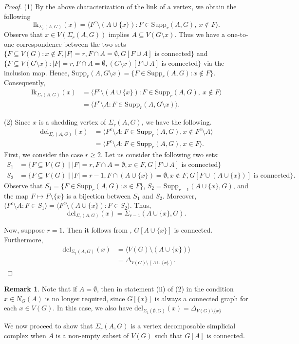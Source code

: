 \documentclass[12pt,reqno]{amsart}
\theoremstyle{definition}
\newtheorem{remark}[proposition]{Remark}
\newcommand{\lk}{{\mathrm{lk}}}
\newcommand{\del}{{\mathrm{del}}}
\newcommand{\Supp}{\mathrm{Supp}}
\def\del{\mathrm{del}}
\def\l{\langle}
\def\r{\rangle}
\def\SrAG{\Sigma_r(A,G)}
\begin{document}
	\begin{proof} 
		(1) By the above characterization of the link of a vertex, we obtain the following
		\[
		\lk_{\Sigma_r(A,G)}(x) = \langle F^c \setminus (A \cup \{x\}) : F \in \mathrm{Supp}_r(A, G),\ x \notin F \rangle.
		\]
		Observe that $x\in V(\SrAG)$ implies $A\subseteq V(G\setminus x)$. Thus we have a one-to-one correspondence between the two sets $\{F\subseteq V(G): x\notin F , |F|=r, F\cap A=\emptyset, G[F\cup A]\text{ is connected}\}$ and $\{F\subseteq V(G\setminus x): |F|=r, F\cap A=\emptyset, (G\setminus x)[F\cup A]\text{ is connected}\}$ via the inclusion map. Hence, $\Supp_r(A,G\setminus x)=\{F\in\Supp_r(A,G): x\notin F\}$. Consequently, 
		\begin{align*}
			\lk_{\Sigma_r(A,G)}(x) &=\langle F^c \setminus (A \cup \{x\}) : F \in \mathrm{Supp}_r(A, G),\ x \notin F \rangle\\
			&=\langle F^c\setminus A: F\in\Supp_r(A, G\setminus x) \rangle. 
		\end{align*} 
	
		(2) Since $x$ is a shedding vertex of $\Sigma_r(A,G)$, we have the following.
		\begin{align*}
			\del_{\Sigma_r(A,G)}(x) &= \langle F^c \setminus A : F \in \mathrm{Supp}_r(A, G), x \notin F^c\setminus A \rangle\\
			&=\l F^c \setminus A : F \in \mathrm{Supp}_r(A, G), x \in F\r.
		\end{align*}
		First, we consider the case $r \ge 2$. Let us consider the following two sets:
		\begin{align*}
			S_1&=\{F\subseteq V(G)\mid |F|=r,F\cap A=\emptyset,x\in F,G[F\cup A]\text{ is connected}\}\\
			S_2&=\{F\subseteq V(G)\mid |F|=r-1,F\cap (A\cup\{x\})=\emptyset,x\notin F,G[F\cup (A\cup\{x\})]\text{ is connected}\}.
		\end{align*}
		Observe that $S_1=\{F\in \Supp_r(A,G): x\in F\}$,  $S_2=\Supp_{r-1}(A\cup\{x\},G)$, and the map $F\mapsto F\setminus\{x\}$ is a bijection between $S_1$ and $S_2$. Moreover, $\l F^c\setminus A: F\in S_1\r=\l F^c\setminus (A\cup\{x\}): F\in S_2\r$. Thus,
		\[
		\del_{\Sigma_r(A,G)}(x) = \Sigma_{r-1}(A \cup \{x\},G).
		\]
		
		Now, suppose $r=1$. Then it follows from , $ G[A\cup\{x\}]$ is connected. Furthermore,
		\begin{align*}
			\del_{\Sigma_1(A,G)}(x)&=\l V(G)\setminus (A\cup\{x\})\r\\
			&=\Delta_{V(G)\setminus (A\cup\{x\})}.
		\end{align*}
	\end{proof}
	\begin{remark}
		Note that if $A=\emptyset$, then in statement (ii) of (2) in  the condition $x\in N_G(A)$ is no longer required, since $G[\{x\}]$ is always a connected graph for each $x\in V(G)$. In this case, we also have $\del_{\Sigma_1(\emptyset,G)}(x) =\Delta_{V(G)\setminus \{x\}}$
	\end{remark}
	We now proceed to show that $\SrAG$ is a vertex decomposable simplicial complex when $A$ is a non-empty subset of $V(G)$ such that $G[A]$ is connected. 
\end{document}
